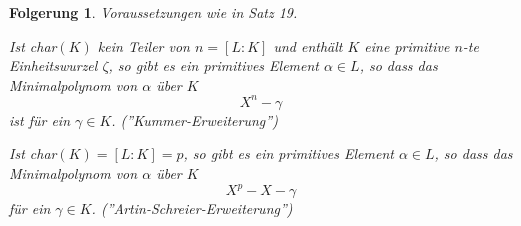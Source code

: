 \documentclass[a4paper,10pt,german]{scrbook}
\theoremstyle{saetze}
\theoremstyle{definitionen}
\newtheorem{Folg}[Def]{Folgerung}
\begin{document}
\begin{Folg}
Voraussetzungen wie in Satz 19.
\begin{enum}

\item Ist char$(K)$ kein Teiler von $n=[L:K]$ und enthält $K$ eine
primitive $n$-te Einheitswurzel $\zeta$, so gibt es ein primitives
Element $\alpha \in L$, so dass das Minimalpolynom von $\alpha$ über
$K$ \[X^n - \gamma\] ist für ein $\gamma \in K$.
(\textit{''Kummer-Erweiterung''})

\item Ist char$(K) = [L:K] = p$, so gibt es ein primitives Element
$\alpha \in L$, so dass das Minimalpolynom von $\alpha$ über $K$
\[ X^p - X - \gamma\] für ein $\gamma \in K$.
(\textit{''Artin-Schreier-Erweiterung''})

\end{enum}
\end{Folg}
\end{document}
